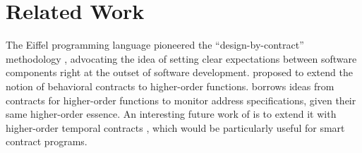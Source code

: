 \section{Related Work} \label{sec:related}

The Eiffel programming language pioneered the ``design-by-contract'' methodology \cite{DBLP:books/ph/Meyer91, DBLP:conf/tools/Meyer98a}, 
advocating the idea of setting clear expectations between software components 
right at the outset of software development.
\citet{DBLP:conf/icfp/FindlerF02} proposed to extend the notion of behavioral contracts 
to higher-order functions.
\lang borrows ideas from contracts for higher-order functions to monitor
address specifications, given their same higher-order essence.
An interesting future work of \lang is to extend it with higher-order temporal contracts \cite{DBLP:conf/icfp/DisneyFM11},
which would be particularly useful for smart contract programs.

\iffalse
This is most related to a security mechanism called stack inspection, which is implemented in systems like \texttt{Java} to prevents access from untrusted components to resources protected by trusted components \cite{DBLP:conf/popl/FournetG02, DBLP:conf/sp/WallachF98}. 
However, \lang propagates address specifications down the stack and performs check at call sites while stack inspection inspects the entire call stack before accessing certain resources.
\fi

